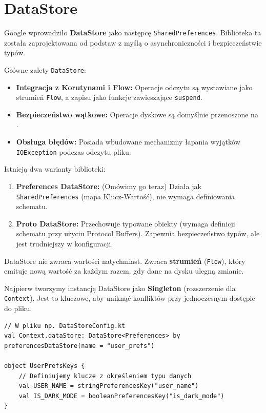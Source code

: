 \section{DataStore}

Google wprowadziło \textbf{DataStore} jako następcę \texttt{SharedPreferences}. Biblioteka ta została zaprojektowana od podstaw z myślą o asynchroniczności i bezpieczeństwie typów.

Główne zalety \texttt{DataStore}:
\begin{itemize}
    \item \textbf{Integracja z Korutynami i Flow:} Operacje odczytu są wystawiane jako strumień \texttt{Flow}, a zapisu jako funkcje zawieszające \texttt{suspend}.
    \item \textbf{Bezpieczeństwo wątkowe:} Operacje dyskowe są domyślnie przenoszone na .
    \item \textbf{Obsługa błędów:} Posiada wbudowane mechanizmy łapania wyjątków \texttt{IOException} podczas odczytu pliku.
\end{itemize}

Istnieją dwa warianty biblioteki:
\begin{enumerate}
    \item \textbf{Preferences DataStore:} (Omówimy go teraz) Działa jak \texttt{SharedPreferences} (mapa Klucz-Wartość), nie wymaga definiowania schematu.
    \item \textbf{Proto DataStore:} Przechowuje typowane obiekty (wymaga definicji schematu przy użyciu Protocol Buffers). Zapewnia bezpieczeństwo typów, ale jest trudniejszy w konfiguracji.
\end{enumerate}

DataStore nie zwraca wartości natychmiast. Zwraca \textbf{strumień} (\texttt{Flow}), który emituje nową wartość za każdym razem, gdy dane na dysku ulegną zmianie.

Najpierw tworzymy instancję DataStore jako \textbf{Singleton} (rozszerzenie dla \texttt{Context}). Jest to kluczowe, aby uniknąć konfliktów przy jednoczesnym dostępie do pliku.

\begin{verbatim}
// W pliku np. DataStoreConfig.kt
val Context.dataStore: DataStore<Preferences> by preferencesDataStore(name = "user_prefs")

object UserPrefsKeys {
    // Definiujemy klucze z określeniem typu danych
    val USER_NAME = stringPreferencesKey("user_name")
    val IS_DARK_MODE = booleanPreferencesKey("is_dark_mode")
}
\end{verbatim}

